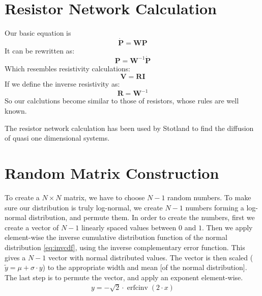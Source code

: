 \documentclass[onecolumn,fleqn]{revtex4}
\begin{document}
\section{Resistor Network Calculation} \label{sec:res_net}
Our basic equation is 
\[ \boldsymbol{ \dot P } = \boldsymbol{W} \boldsymbol{P} \]
It can be rewritten as:
\[  \boldsymbol{P} = \boldsymbol{W}^{-1}\boldsymbol{ \dot P } \]
Which resembles resistivity calculations:
\[ \boldsymbol{V} = \boldsymbol{R}\boldsymbol{ I } \]
If we define the inverse resistivity as:
\[ \boldsymbol{R} = \boldsymbol{W}^{-1} \]
So our calclutions become similar to those of resistors, whose rules are well known.

The resistor network calculation has been used by Stotland to find the diffusion of quasi one dimensional systems.

\section{Random Matrix Construction}\label{sec:matrix_construction}
To create a $N\times N$ matrix, we have to choose $N-1$ random numbers. To make sure our distribution is truly log-normal, we create $N-1$ numbers forming a log-normal distribution, and permute them. In order to create the numbers, first we create a vector of $N-1$ linearly spaced values between $0$ and $1$. Then we apply element-wise the inverse cumulative distribution function of the normal distribution \ref{eq:invcdf}, using the inverse complementary error function. This gives a $N-1$ vector with normal distributed values. The vector is then scaled ($\tilde{y} = \mu+\sigma\cdot y$) to the appropriate width and mean [of the normal distribution]. The last step is to permute the vector, and apply an exponent element-wise.
\begin{align}\label{eq:invcdf}
y = -\sqrt{2}\cdot\operatorname{erfcinv}(2\cdot x) 
\end{align}
\end{document}
